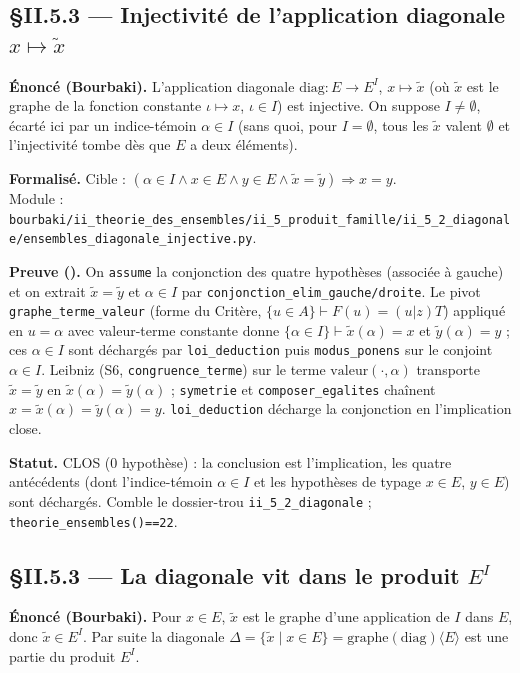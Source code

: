 \subsection{§II.5.3 --- Injectivité de l'application diagonale $x\mapsto\tilde{x}$}
\textbf{Énoncé (Bourbaki).} L'application diagonale $\mathrm{diag}:E\to E^I$, $x\mapsto\tilde{x}$ (où $\tilde{x}$ est le graphe de la fonction constante $\iota\mapsto x$, $\iota\in I$) est injective. On suppose $I\neq\emptyset$, écarté ici par un indice-témoin $\alpha\in I$ (sans quoi, pour $I=\emptyset$, tous les $\tilde{x}$ valent $\emptyset$ et l'injectivité tombe dès que $E$ a deux éléments).

\textbf{Formalisé.} Cible : $(\alpha\in I \wedge x\in E \wedge y\in E \wedge \tilde{x}=\tilde{y})\Rightarrow x=y$. \\
Module : \texttt{bourbaki/ii\_theorie\_des\_ensembles/ii\_5\_produit\_famille/ii\_5\_2\_diagonale/ensembles\_diagonale\_injective.py}.

\textbf{Preuve (\Nstar).} On \texttt{assume} la conjonction des quatre hypothèses (associée à gauche) et on extrait $\tilde{x}=\tilde{y}$ et $\alpha\in I$ par \texttt{conjonction\_elim\_gauche/droite}. Le pivot \texttt{graphe\_terme\_valeur} (forme du Critère, $\{u\in A\}\vdash F(u)=(u|z)T$) appliqué en $u=\alpha$ avec valeur-terme constante donne $\{\alpha\in I\}\vdash\tilde{x}(\alpha)=x$ et $\tilde{y}(\alpha)=y$ ; ces $\alpha\in I$ sont déchargés par \texttt{loi\_deduction} puis \texttt{modus\_ponens} sur le conjoint $\alpha\in I$. Leibniz (S6, \texttt{congruence\_terme}) sur le terme $\mathrm{valeur}(\cdot,\alpha)$ transporte $\tilde{x}=\tilde{y}$ en $\tilde{x}(\alpha)=\tilde{y}(\alpha)$ ; \texttt{symetrie} et \texttt{composer\_egalites} chaînent $x=\tilde{x}(\alpha)=\tilde{y}(\alpha)=y$. \texttt{loi\_deduction} décharge la conjonction en l'implication close.

\textbf{Statut.} CLOS (0 hypothèse) : la conclusion est l'implication, les quatre antécédents (dont l'indice-témoin $\alpha\in I$ et les hypothèses de typage $x\in E$, $y\in E$) sont déchargés. Comble le dossier-trou \texttt{ii\_5\_2\_diagonale} ; \texttt{theorie\_ensembles()==22}.


\subsection{§II.5.3 --- La diagonale vit dans le produit $E^I$}
\textbf{Énoncé (Bourbaki).} Pour $x\in E$, $\tilde{x}$ est le graphe d'une application de $I$ dans $E$, donc $\tilde{x}\in E^I$. Par suite la diagonale $\Delta=\{\tilde{x}\mid x\in E\}=\mathrm{graphe}(\mathrm{diag})\langle E\rangle$ est une partie du produit $E^I$.

